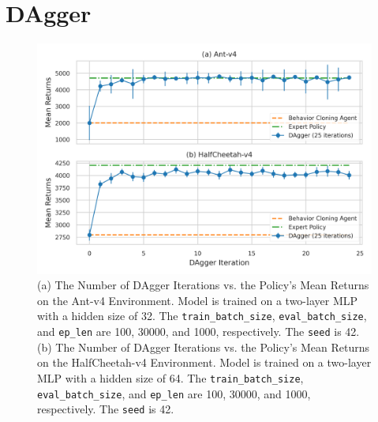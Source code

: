 \documentclass[10pt, letterpaper]{article}
\begin{document}
    \section{DAgger}
    \begin{figure}[htbp]
        \centering
        \includegraphics[]{img/q_2_2.png}
        \caption{(a) The Number of DAgger Iterations vs. the Policy's Mean Returns on the Ant-v4 Environment. Model is trained on a two-layer MLP with a hidden size of 32. The \texttt{train\_batch\_size}, \texttt{eval\_batch\_size}, and \texttt{ep\_len} are 100, 30000, and 1000, respectively. The \texttt{seed} is 42. (b) The Number of DAgger Iterations vs. the Policy's Mean Returns on the HalfCheetah-v4 Environment. Model is trained on a two-layer MLP with a hidden size of 64. The \texttt{train\_batch\_size}, \texttt{eval\_batch\_size}, and \texttt{ep\_len} are 100, 30000, and 1000, respectively. The \texttt{seed} is 42.}
        \label{fig:2}
    \end{figure}
    
\end{document}
